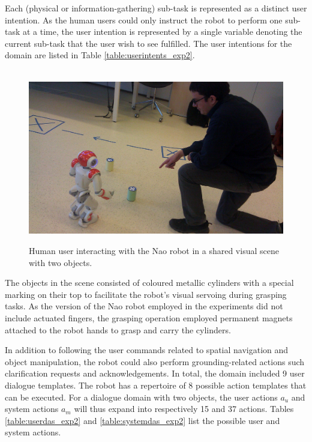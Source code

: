 Each (physical or information-gathering) sub-task is represented as a distinct user intention. As the human users could only instruct the robot to perform one sub-task at a time, the user intention is represented by a single variable denoting the current sub-task that the user wish to see fulfilled.  The user intentions for the domain are listed in Table \ref{table:userintents_exp2}. 

\begin{figure}[ht]
$\phantom{a}$ \\[2mm]
\centering
\includegraphics[scale=0.12]{imgs/jonathon2.jpg}
\caption{Human user interacting with the Nao robot in a shared visual scene with two objects.}
\label{fig:naochap6}
\end{figure}

The objects in the scene consisted of coloured metallic cylinders with a special marking on their top to facilitate the robot's visual servoing during grasping tasks.  As the version of the Nao robot employed in the experiments did not include actuated fingers, the grasping operation employed permanent magnets attached to the robot hands to grasp and carry the cylinders.

In addition to following the user commands related to spatial navigation and object manipulation, the robot could also perform grounding-related actions such clarification requests and acknowledgements. In total, the domain included 9 user dialogue templates.  The robot has a repertoire of 8 possible action templates that can be executed.  For a dialogue domain with two objects, the user actions $a_u$ and system actions $a_m$ will thus expand into respectively 15 and 37 actions.  Tables \ref{table:userdas_exp2} and \ref{table:systemdas_exp2} list the possible user and system actions.

